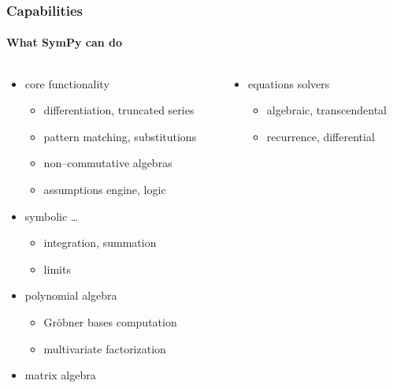 \documentclass[handout]{beamer}
\begin{document}
\begin{frame}[fragile]
    \frametitle{Capabilities}
    \framesubtitle{What SymPy can do}

    \begin{columns}
        \begin{column}[l]{0.5\textwidth}
            \begin{itemize}
                \item core functionality
                    \begin{itemize}
                        \item differentiation, truncated series
                        \item pattern matching, substitutions
                        \item non--commutative algebras
                        \item assumptions engine, logic
                    \end{itemize}
                \item symbolic \ldots
                    \begin{itemize}
                        \item integration, summation
                        \item limits
                    \end{itemize}
                \item polynomial algebra
                    \begin{itemize}
                        \item Gröbner bases computation
                        \item multivariate factorization
                    \end{itemize}
                \item matrix algebra
            \end{itemize}
        \end{column}
        \begin{column}[r]{0.5\textwidth}
            \begin{itemize}
                \item equations solvers
                    \begin{itemize}
                        \item algebraic, transcendental
                        \item recurrence, differential
                    \end{itemize}

\end{itemize}
\end{column}
\end{columns}
\end{frame}
\end{document}
